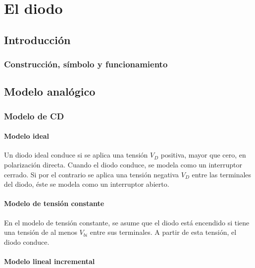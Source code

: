 \chapter{El diodo}

\section{Introducción}

\subsection{Construcción, símbolo y funcionamiento}




\section{Modelo analógico}

\subsection{Modelo de CD}


\subsubsection{Modelo ideal}

Un diodo ideal conduce si se aplica una tensión $V_D$ positiva, mayor que cero, en polarización directa. Cuando el diodo conduce, se modela como un interruptor cerrado. Si por el contrario se aplica una tensión negativa $V_D$ entre las terminales del diodo, éste se modela como un interruptor abierto.


\subsubsection{Modelo de tensión constante}

En el modelo de tensión constante, se asume que el diodo está encendido si tiene una tensión de al menos $V_{bi}$ entre sus terminales. A partir de esta tensión, el diodo conduce.


\subsubsection{Modelo lineal incremental}

